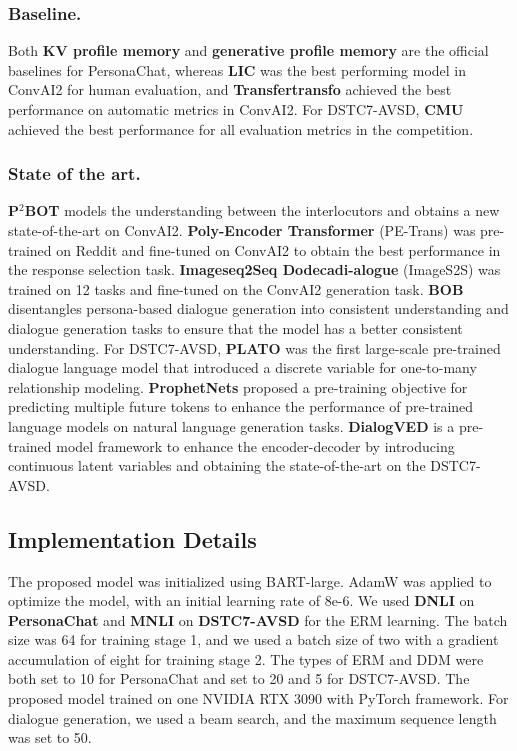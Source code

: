 \documentclass[letterpaper]{article} \usepackage{aaai23}  \usepackage{times}  \usepackage{helvet}  \usepackage{courier}  \usepackage[hyphens]{url}  \usepackage{graphicx} \urlstyle{rm} \def\UrlFont{\rm}  \usepackage{natbib}  \usepackage{caption} \frenchspacing  \setlength{\pdfpagewidth}{8.5in}  \setlength{\pdfpageheight}{11in}  \usepackage{algorithm}
\begin{document}
\subsubsection{Baseline.}
Both \textbf{KV profile memory} and \textbf{generative profile memory} \cite{Zhang2018} are the official baselines for PersonaChat, whereas \textbf{LIC} \cite{Golovanov2020} was the best performing model in ConvAI2 for human evaluation, and \textbf{Transfertransfo} \cite{Wolf2019} achieved the best performance on automatic metrics in ConvAI2. For DSTC7-AVSD, \textbf{CMU} \cite{Sanabria2018} achieved the best performance for all evaluation metrics in the competition.
\subsubsection{State of the art.}
\textbf{P$^2$BOT} \cite{Liu2020} models the understanding between the interlocutors and obtains a new state-of-the-art on ConvAI2. \textbf{Poly-Encoder Transformer} (PE-Trans) \cite{Humeau2019} was pre-trained on Reddit and fine-tuned on ConvAI2 to obtain the best performance in the response selection task. \textbf{Imageseq2Seq Dodecadi-alogue} (ImageS2S) \cite{Shuster2020} was trained on 12 tasks and fine-tuned on the ConvAI2 generation task. \textbf{BOB} \cite{Song2021} disentangles persona-based dialogue generation into consistent understanding and dialogue generation tasks to ensure that the model has a better consistent understanding. For DSTC7-AVSD, \textbf{PLATO} \cite{Bao2020} was the first large-scale pre-trained dialogue language model that introduced a discrete variable for one-to-many relationship modeling. \textbf{ProphetNets} \cite{Qi2020} proposed a pre-training objective for predicting multiple future tokens to enhance the performance of pre-trained language models on natural language generation tasks. \textbf{DialogVED} \cite{Chen2022} is a pre-trained model framework to enhance the encoder-decoder by introducing continuous latent variables and obtaining the state-of-the-art on the DSTC7-AVSD.

\subsection{Implementation Details}
The proposed model was initialized using BART-large. AdamW \cite{Loshchilov2017} was applied to optimize the model, with an initial learning rate of 8e-6. We used \textbf{DNLI} on \textbf{PersonaChat} and \textbf{MNLI} on \textbf{DSTC7-AVSD} for the ERM learning. The batch size was 64 for training stage 1, and we used a batch size of two with a gradient accumulation of eight for training stage 2. The types of ERM and DDM were both set to 10 for PersonaChat and set to 20 and 5 for DSTC7-AVSD. The proposed model trained on one NVIDIA RTX 3090 with PyTorch framework. For dialogue generation, we used a beam search, and the maximum sequence length was set to 50. 
\end{document}
